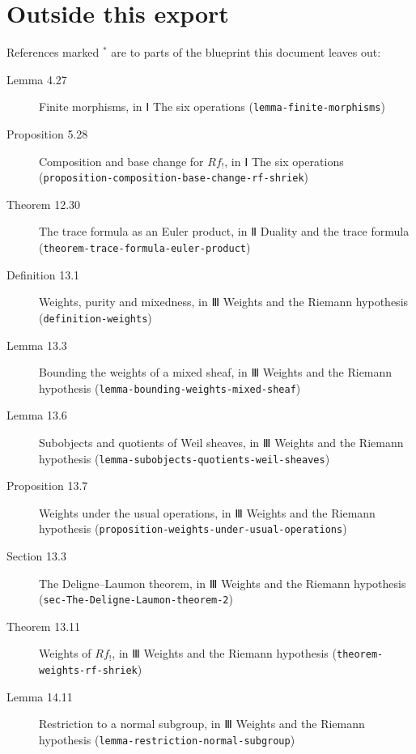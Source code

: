 \documentclass[11pt]{article}
\newcommand{\bpslug}[1]{\texttt{#1}}
\begin{document}
\section*{Outside this export}
References marked \ensuremath{{}^\ast} are to parts of the blueprint this document leaves out:
\begin{description}
\item[Lemma 4.27] Finite morphisms, in Ⅰ The six operations (\bpslug{lemma-{}\allowbreak{}finite-{}\allowbreak{}morphisms})
\item[Proposition 5.28] Composition and base change for $Rf_!$, in Ⅰ The six operations (\bpslug{proposition-{}\allowbreak{}composition-{}\allowbreak{}base-{}\allowbreak{}change-{}\allowbreak{}rf-{}\allowbreak{}shriek})
\item[Theorem 12.30] The trace formula as an Euler product, in Ⅱ Duality and the trace formula (\bpslug{theorem-{}\allowbreak{}trace-{}\allowbreak{}formula-{}\allowbreak{}euler-{}\allowbreak{}product})
\item[Definition 13.1] Weights, purity and mixedness, in Ⅲ Weights and the Riemann hypothesis (\bpslug{definition-{}\allowbreak{}weights})
\item[Lemma 13.3] Bounding the weights of a mixed sheaf, in Ⅲ Weights and the Riemann hypothesis (\bpslug{lemma-{}\allowbreak{}bounding-{}\allowbreak{}weights-{}\allowbreak{}mixed-{}\allowbreak{}sheaf})
\item[Lemma 13.6] Subobjects and quotients of Weil sheaves, in Ⅲ Weights and the Riemann hypothesis (\bpslug{lemma-{}\allowbreak{}subobjects-{}\allowbreak{}quotients-{}\allowbreak{}weil-{}\allowbreak{}sheaves})
\item[Proposition 13.7] Weights under the usual operations, in Ⅲ Weights and the Riemann hypothesis (\bpslug{proposition-{}\allowbreak{}weights-{}\allowbreak{}under-{}\allowbreak{}usual-{}\allowbreak{}operations})
\item[Section 13.3] The Deligne–Laumon theorem, in Ⅲ Weights and the Riemann hypothesis (\bpslug{sec-{}\allowbreak{}The-{}\allowbreak{}Deligne-{}\allowbreak{}Laumon-{}\allowbreak{}theorem-{}\allowbreak{}2})
\item[Theorem 13.11] Weights of $Rf_!$, in Ⅲ Weights and the Riemann hypothesis (\bpslug{theorem-{}\allowbreak{}weights-{}\allowbreak{}rf-{}\allowbreak{}shriek})
\item[Lemma 14.11] Restriction to a normal subgroup, in Ⅲ Weights and the Riemann hypothesis (\bpslug{lemma-{}\allowbreak{}restriction-{}\allowbreak{}normal-{}\allowbreak{}subgroup})

\end{description}
\end{document}
